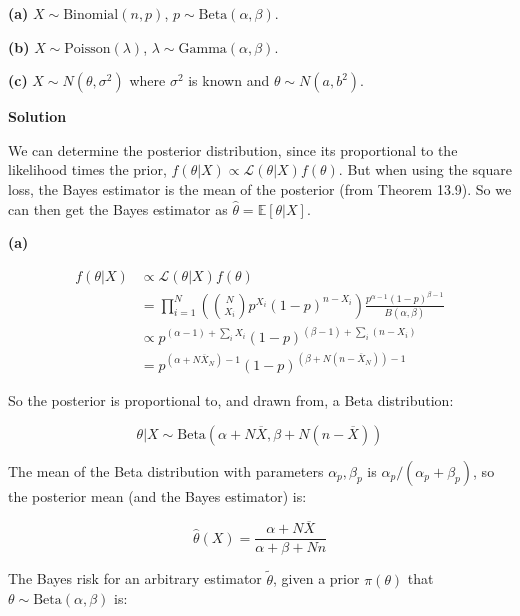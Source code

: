 \textbf{(a)} \(X \sim \text{Binomial}(n, p)\),
\(p \sim \text{Beta}(\alpha, \beta)\).

\textbf{(b)} \(X \sim \text{Poisson}(\lambda)\),
\(\lambda \sim \text{Gamma}(\alpha, \beta)\).

\textbf{(c)} \(X \sim N(\theta, \sigma^2)\) where \(\sigma^2\) is known
and \(\theta \sim N(a, b^2)\).

\textbf{Solution}

We can determine the posterior distribution, since its proportional to
the likelihood times the prior,
\(f(\theta | X) \propto \mathcal{L}(\theta | X) f(\theta)\). But when
using the square loss, the Bayes estimator is the mean of the posterior
(from Theorem 13.9). So we can then get the Bayes estimator as
\(\hat{\theta} = \mathbb{E}[\theta | X]\).

\textbf{(a)}

\begin{align}
f(\theta | X) &\propto \mathcal{L}(\theta | X) f(\theta) \\
&= \prod_{i = 1}^N \left( \binom{N}{X_i} p^{X_i}(1 - p)^{n - X_i} \right) \frac{p^{\alpha - 1}(1-p)^{\beta - 1}}{B(\alpha, \beta)} \\
& \propto p^{(\alpha - 1) + \sum_i X_i} (1 - p)^{(\beta - 1) + \sum_i (n - X_i)} \\
&= p^{\left(\alpha + N \overline{X}_N \right) - 1} (1 - p)^{\left(\beta + N(n - \overline{X}_N) \right)- 1}
\end{align}

So the posterior is proportional to, and drawn from, a Beta
distribution:

\[ \theta | X \sim \text{Beta}\left(\alpha + N \overline{X}, \beta + N(n - \overline{X}) \right)\]

The mean of the Beta distribution with parameters \(\alpha_p, \beta_p\)
is \(\alpha_p / (\alpha_p + \beta_p)\), so the posterior mean (and the
Bayes estimator) is:

\[ \hat{\theta}(X) = \frac{\alpha + N \overline{X}}{\alpha + \beta + Nn} \]

The Bayes risk for an arbitrary estimator \(\tilde{\theta}\), given a
prior \(\pi(\theta)\) that \(\theta \sim \text{Beta}(\alpha, \beta)\)
is:

